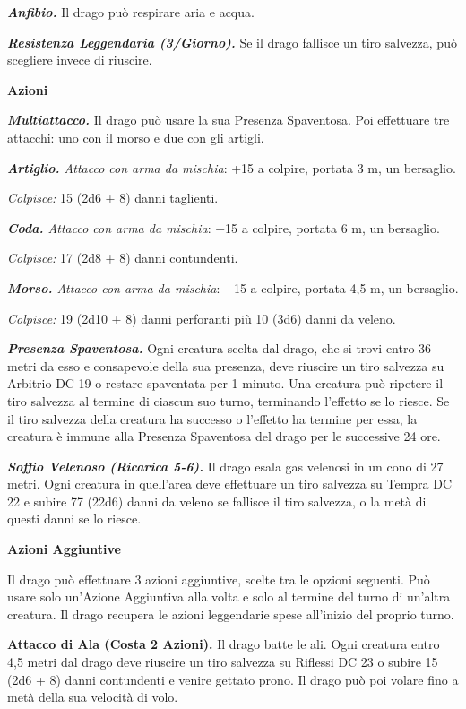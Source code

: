 \begin{multicols}{2}
\emph{\textbf{Anfibio.}} Il drago può respirare aria e acqua.

\emph{\textbf{Resistenza Leggendaria (3/Giorno).}} Se il drago fallisce
un tiro salvezza, può scegliere invece di riuscire.

\textbf{Azioni}

\emph{\textbf{Multiattacco.}} Il drago può usare la sua Presenza
Spaventosa. Poi effettuare tre attacchi: uno con il morso e due con gli
artigli.

\emph{\textbf{Artiglio.} Attacco con arma da mischia}: +15 a colpire,
portata 3 m, un bersaglio.

\emph{Colpisce:} 15 (2d6 + 8) danni taglienti.

\emph{\textbf{Coda.} Attacco con arma da mischia}: +15 a colpire,
portata 6 m, un bersaglio.

\emph{Colpisce:} 17 (2d8 + 8) danni contundenti.

\emph{\textbf{Morso.} Attacco con arma da mischia}: +15 a colpire,
portata 4,5 m, un bersaglio.

\emph{Colpisce:} 19 (2d10 + 8) danni perforanti più 10 (3d6) danni da
veleno.

\emph{\textbf{Presenza Spaventosa.}} Ogni creatura scelta dal drago, che
si trovi entro 36 metri da esso e consapevole della sua presenza, deve
riuscire un tiro salvezza su Arbitrio DC 19 o restare spaventata per 1
minuto. Una creatura può ripetere il tiro salvezza al termine di ciascun
suo turno, terminando l'effetto se lo riesce. Se il tiro salvezza della
creatura ha successo o l'effetto ha termine per essa, la creatura è
immune alla Presenza Spaventosa del drago per le successive 24 ore.

\emph{\textbf{Soffio Velenoso (Ricarica 5-6).}} Il drago esala gas
velenosi in un cono di 27 metri. Ogni creatura in quell'area deve
effettuare un tiro salvezza su Tempra DC 22 e subire 77 (22d6)
danni da veleno se fallisce il tiro salvezza, o la metà di questi danni
se lo riesce.

\textbf{Azioni Aggiuntive}

Il drago può effettuare 3 azioni aggiuntive, scelte tra le opzioni
seguenti. Può usare solo un'Azione Aggiuntiva alla volta e solo al
termine del turno di un'altra creatura. Il drago recupera le azioni
leggendarie spese all'inizio del proprio turno.

\textbf{Attacco di Ala (Costa 2 Azioni).} Il drago batte le ali. Ogni
creatura entro 4,5 metri dal drago deve riuscire un tiro salvezza su Riflessi DC 23 o subire 15 (2d6 + 8) danni contundenti e venire gettato
prono. Il drago può poi volare fino a metà della sua velocità di volo.


\end{multicols}
